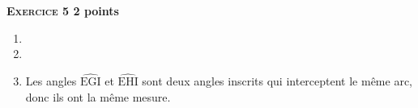 \textbf{\textsc{Exercice 5} \hfill 2 points}

\medskip

\begin{enumerate}
\item 
\item
\item Les angles $\widehat{\text{EGI}}$ et $\widehat{\text{EHI}}$ sont deux angles inscrits qui interceptent le même arc, donc ils ont la même mesure.
\end{enumerate}

\vspace{0,5cm}

